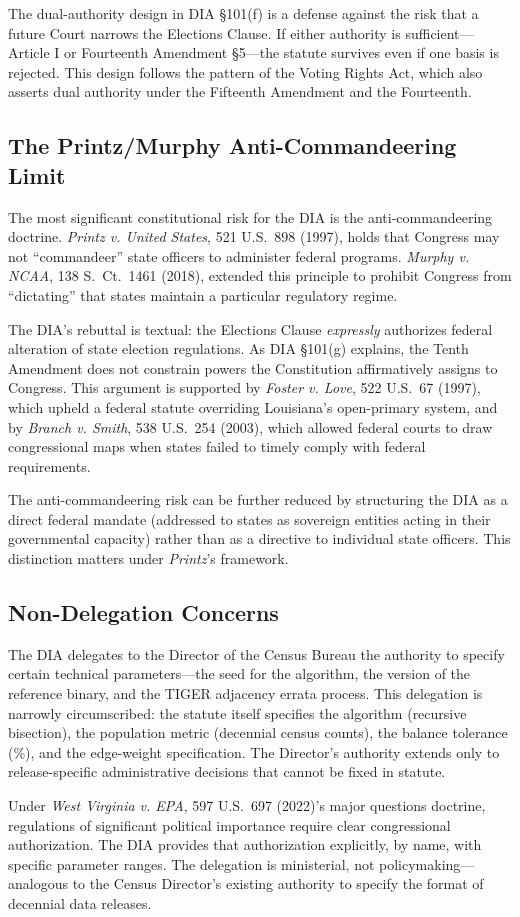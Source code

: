 The dual-authority design in DIA \S101(f) is a defense against the risk that a future Court narrows the Elections Clause. If either authority is sufficient---Article I or Fourteenth Amendment \S5---the statute survives even if one basis is rejected. This design follows the pattern of the Voting Rights Act, which also asserts dual authority under the Fifteenth Amendment and the Fourteenth.

\subsection{The Printz/Murphy Anti-Commandeering Limit}

The most significant constitutional risk for the DIA is the anti-commandeering doctrine. \textit{Printz v. United States}, 521 U.S.\ 898 (1997), holds that Congress may not ``commandeer'' state officers to administer federal programs. \textit{Murphy v. NCAA}, 138 S.\ Ct.\ 1461 (2018), extended this principle to prohibit Congress from ``dictating'' that states maintain a particular regulatory regime.

The DIA's rebuttal is textual: the Elections Clause \emph{expressly} authorizes federal alteration of state election regulations. As DIA \S101(g) explains, the Tenth Amendment does not constrain powers the Constitution affirmatively assigns to Congress. This argument is supported by \textit{Foster v. Love}, 522 U.S.\ 67 (1997), which upheld a federal statute overriding Louisiana's open-primary system, and by \textit{Branch v. Smith}, 538 U.S.\ 254 (2003), which allowed federal courts to draw congressional maps when states failed to timely comply with federal requirements.

The anti-commandeering risk can be further reduced by structuring the DIA as a direct federal mandate (addressed to states as sovereign entities acting in their governmental capacity) rather than as a directive to individual state officers. This distinction matters under \textit{Printz}'s framework.

\subsection{Non-Delegation Concerns}

The DIA delegates to the Director of the Census Bureau the authority to specify certain technical parameters---the seed for the algorithm, the version of the reference binary, and the TIGER adjacency errata process. This delegation is narrowly circumscribed: the statute itself specifies the algorithm (recursive bisection), the population metric (decennial census counts), the balance tolerance (\%), and the edge-weight specification. The Director's authority extends only to release-specific administrative decisions that cannot be fixed in statute.

Under \textit{West Virginia v. EPA}, 597 U.S.\ 697 (2022)'s major questions doctrine, regulations of significant political importance require clear congressional authorization. The DIA provides that authorization explicitly, by name, with specific parameter ranges. The delegation is ministerial, not policymaking---analogous to the Census Director's existing authority to specify the format of decennial data releases.
